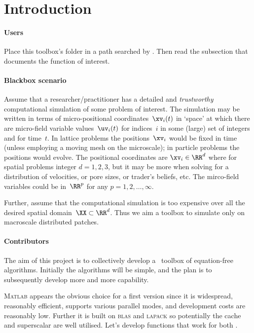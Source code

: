 \section{Introduction}


\paragraph{Users}
Place this toolbox's folder in a path searched by \script.
Then read the subsection that documents the function of interest.


\paragraph{Blackbox scenario}
Assume that a researcher\slash practitioner has a detailed and \emph{trustworthy} computational simulation of some problem of interest.
The simulation may be written in terms of micro-positional coordinates~\(\xv_i(t)\) in `space' at which there are micro-field variable values~\(\uv_i(t)\) for indices~\(i\) in some (large) set of integers and for time~\(t\).
In lattice problems the positions~\(\xv_i\) would be fixed in time (unless employing a moving mesh on the microscale); in particle problems the positions would evolve.
The positional coordinates are \(\xv_i\in\RR^{d}\) where for spatial problems integer \(d=1,2,3\), but it may be more when solving for a distribution of velocities, or pore sizes, or trader's beliefs, etc.
The mirco-field variables could be in~\(\RR^{p}\) for any \(p=1,2,\ldots,\infty\).

Further, assume that the computational simulation is too expensive over all the desired spatial domain~\(\XX\subset\RR^{d}\).
Thus we aim a toolbox to simulate only on macroscale distributed patches.



\paragraph{Contributors}
The aim of this project is to collectively develop a \script\ toolbox of equation-free algorithms.
Initially the algorithms will be simple, and the plan is to subsequently develop more and more capability.

\textsc{Matlab} appears the obvious choice for a first version since it is widespread, reasonably efficient, supports various parallel modes, and development costs are reasonably low.
Further it is built on \textsc{blas} and \textsc{lapack} so potentially the cache and superscalar \cpu{} are well utilised.
Let's develop functions that work for both \script.




